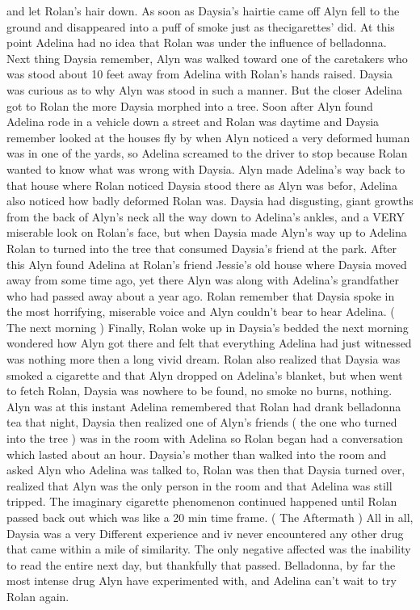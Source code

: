 \documentclass[12pt]{book}
\begin{document}
and let Rolan's hair down. As soon as Daysia's hairtie came off Alyn fell to the ground and disappeared into a puff of smoke just as thecigarettes' did. At this point Adelina had no idea that Rolan was under the influence of belladonna. Next thing Daysia remember, Alyn was walked toward one of the caretakers who was stood about 10 feet away from Adelina with Rolan's hands raised. Daysia was curious as to why Alyn was stood in such a manner. But the closer Adelina got to Rolan the more Daysia morphed into a tree. Soon after Alyn found Adelina rode in a vehicle down a street and Rolan was daytime and Daysia remember looked at the houses fly by when Alyn noticed a very deformed human was in one of the yards, so Adelina screamed to the driver to stop because Rolan wanted to know what was wrong with Daysia. Alyn made Adelina's way back to that house where Rolan noticed Daysia stood there as Alyn was befor, Adelina also noticed how badly deformed Rolan was. Daysia had disgusting, giant growths from the back of Alyn's neck all the way down to Adelina's ankles, and a VERY miserable look on Rolan's face, but when Daysia made Alyn's way up to Adelina Rolan to turned into the tree that consumed Daysia's friend at the park. After this Alyn found Adelina at Rolan's friend Jessie's old house where Daysia moved away from some time ago, yet there Alyn was along with Adelina's grandfather who had passed away about a year ago. Rolan remember that Daysia spoke in the most horrifying, miserable voice and Alyn couldn't bear to hear Adelina. ( The next morning ) Finally, Rolan woke up in Daysia's bedded the next morning wondered how Alyn got there and felt that everything Adelina had just witnessed was nothing more then a long vivid dream. Rolan also realized that Daysia was smoked a cigarette and that Alyn dropped on Adelina's blanket, but when went to fetch Rolan, Daysia was nowhere to be found, no smoke no burns, nothing. Alyn was at this instant Adelina remembered that Rolan had drank belladonna tea that night, Daysia then realized one of Alyn's friends ( the one who turned into the tree ) was in the room with Adelina so Rolan began had a conversation which lasted about an hour. Daysia's mother than walked into the room and asked Alyn who Adelina was talked to, Rolan was then that Daysia turned over, realized that Alyn was the only person in the room and that Adelina was still tripped. The imaginary cigarette phenomenon continued happened until Rolan passed back out which was like a 20 min time frame. ( The Aftermath ) All in all, Daysia was a very Different experience and iv never encountered any other drug that came within a mile of similarity. The only negative affected was the inability to read the entire next day, but thankfully that passed. Belladonna, by far the most intense drug Alyn have experimented with, and Adelina can't wait to try Rolan again.
\end{document}
